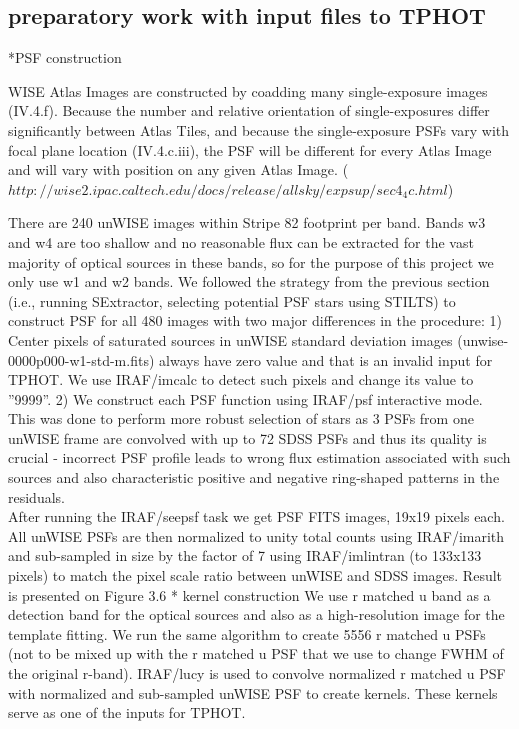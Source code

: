 \documentclass[numberedappendix,apj,twocolumn]{emulateapj}
\begin{document}

\subsection{preparatory work with input files to TPHOT} 
	
*PSF construction

WISE Atlas Images are constructed by coadding many single-exposure images (IV.4.f). Because the number and relative orientation of single-exposures differ significantly between Atlas Tiles, and because the single-exposure PSFs vary with focal plane location (IV.4.c.iii), the PSF will be different for every Atlas Image and will vary with position on any given Atlas Image. ($http://wise2.ipac.caltech.edu/docs/release/allsky/expsup/sec4_4c.html$)


There are 240 unWISE images within Stripe 82 footprint per band. Bands w3 and w4
are too shallow and no reasonable flux can be extracted for the vast majority of
optical sources in these bands, so for the purpose of this project we only use w1
and w2 bands. We followed the strategy from the previous section (i.e., running SExtractor, selecting potential PSF stars using STILTS) to construct PSF for all 480 images with two major differences
in the procedure:
1) Center pixels of saturated sources in unWISE standard deviation images (unwise-
0000p000-w1-std-m.fits) always have zero value and that is an invalid input for TPHOT.
We use IRAF/imcalc to detect such pixels and change its value to ”9999”.
2) We construct each PSF function using IRAF/psf interactive mode. This was done to perform more robust selection of stars as 3 PSFs from one unWISE
frame are convolved with up to 72 SDSS PSFs and thus its quality is crucial - incorrect
PSF profile leads to wrong flux estimation associated with such sources and also
characteristic positive and negative ring-shaped patterns in the residuals.
\\
After running the IRAF/seepsf task we get PSF FITS images, 19x19 pixels each. All
unWISE PSFs are then normalized to unity total counts using IRAF/imarith and sub-sampled
in size by the factor of 7 using IRAF/imlintran (to 133x133 pixels) to match the pixel
scale ratio between unWISE and SDSS images. Result is presented on Figure 3.6	
	* kernel construction
We use r matched u band as a detection band for the optical sources and also as a high-resolution image for the template fitting. We run the same algorithm to create 5556 r matched u PSFs (not to be mixed up with the r matched u PSF that we use to change FWHM of the original r-band). IRAF/lucy is used to convolve normalized r matched u PSF with normalized and sub-sampled unWISE PSF to create kernels. These kernels serve as one of the inputs for TPHOT.
\end{document}
